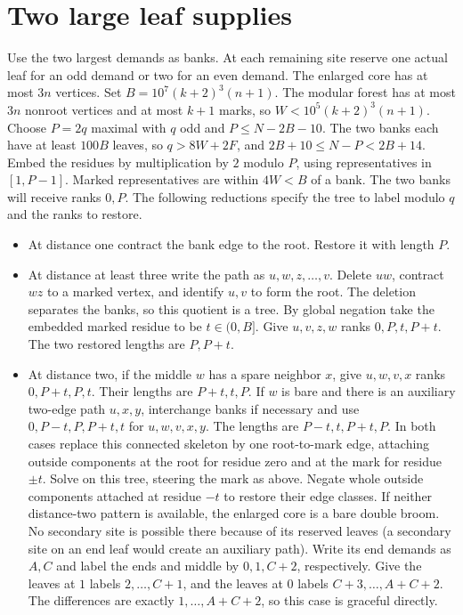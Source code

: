 \section{Two large leaf supplies}
Use the two largest demands as banks. At each remaining site reserve
one actual leaf for an odd demand or two for an even demand. The
enlarged core has at most $3n$ vertices. Set $B=10^7(k+2)^3(n+1)$. The modular forest has at most
$3n$ nonroot vertices and at most $k+1$ marks, so
$W<10^5(k+2)^3(n+1)$. Choose $P=2q$ maximal with $q$ odd and
$P\le N-2B-10$. The two banks each have at least $100B$ leaves,
so $q>8W+2F$, and $2B+10\le N-P<2B+14$. Embed the residues by
multiplication by $2$ modulo $P$, using representatives in $[1,P-1]$.
Marked representatives are within $4W<B$ of a bank. The two
banks will receive ranks $0,P$. The following reductions specify the
tree to label modulo $q$ and the ranks to restore.
\begin{itemize}
\item At distance one contract the bank edge to the root. Restore it
with length $P$.
\item At distance at least three write the path as $u,w,z,\ldots,v$.
Delete $uw$, contract $wz$ to a marked vertex, and identify $u,v$ to
form the root. The deletion separates the banks, so this quotient is
a tree. By global negation take the embedded marked residue to be
$t\in(0,B]$. Give $u,v,z,w$ ranks $0,P,t,P+t$. The two restored
lengths are $P,P+t$.
\item At distance two, if the middle $w$ has a spare neighbor $x$,
give $u,w,v,x$ ranks $0,P+t,P,t$. Their lengths are $P+t,t,P$.
If $w$ is bare and there is an auxiliary two-edge path $u,x,y$,
interchange banks if necessary and use $0,P-t,P,P+t,t$ for
$u,w,v,x,y$. The lengths are $P-t,t,P+t,P$.
In both cases replace this connected skeleton by one root-to-mark
edge, attaching outside components at the root for residue zero and
at the mark for residue $\pm t$. Solve on this tree, steering the
mark as above. Negate whole outside components attached at residue
$-t$ to restore their edge classes. If neither distance-two pattern
is available, the enlarged core is a bare double broom. No secondary
site is possible there because of its reserved leaves (a secondary
site on an end leaf would create an auxiliary path). Write its end demands as $A,C$ and label the ends and middle by
$0,1,C+2$, respectively. Give the leaves at $1$ labels
$2,\ldots,C+1$, and the leaves at $0$ labels
$C+3,\ldots,A+C+2$. The differences are exactly
$1,\ldots,A+C+2$, so this case is graceful directly.
\end{itemize}

